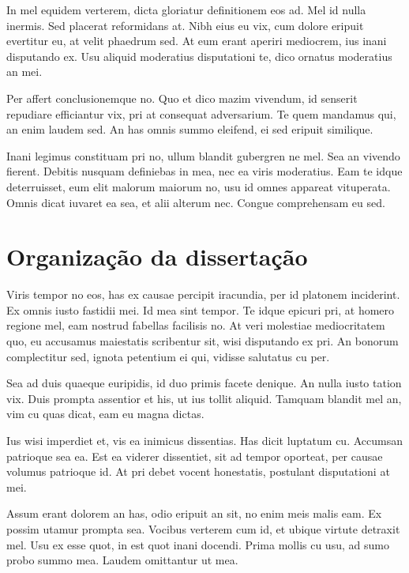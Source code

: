 In mel equidem verterem, dicta gloriatur definitionem eos ad. Mel id nulla inermis. Sed placerat reformidans at. Nibh eius eu vix, cum dolore eripuit evertitur eu, at velit phaedrum sed. At eum erant aperiri mediocrem, ius inani disputando ex. Usu aliquid moderatius disputationi te, dico ornatus moderatius an mei.

Per affert conclusionemque no. Quo et dico mazim vivendum, id senserit repudiare efficiantur vix, pri at consequat adversarium. Te quem mandamus qui, an enim laudem sed. An has omnis summo eleifend, ei sed eripuit similique.

Inani legimus constituam pri no, ullum blandit gubergren ne mel. Sea an vivendo fierent. Debitis nusquam definiebas in mea, nec ea viris moderatius. Eam te idque deterruisset, eum elit malorum maiorum no, usu id omnes appareat vituperata. Omnis dicat iuvaret ea sea, et alii alterum nec. Congue comprehensam eu sed.



\section{Organização da dissertação}

Viris tempor no eos, has ex causae percipit iracundia, per id platonem inciderint. Ex omnis iusto fastidii mei. Id mea sint tempor. Te idque epicuri pri, at homero regione mel, eam nostrud fabellas facilisis no. At veri molestiae mediocritatem quo, eu accusamus maiestatis scribentur sit, wisi disputando ex pri. An bonorum complectitur sed, ignota petentium ei qui, vidisse salutatus cu per.

Sea ad duis quaeque euripidis, id duo primis facete denique. An nulla iusto tation vix. Duis prompta assentior et his, ut ius tollit aliquid. Tamquam blandit mel an, vim cu quas dicat, eam eu magna dictas.

Ius wisi imperdiet et, vis ea inimicus dissentias. Has dicit luptatum cu. Accumsan patrioque sea ea. Est ea viderer dissentiet, sit ad tempor oporteat, per causae volumus patrioque id. At pri debet vocent honestatis, postulant disputationi at mei.

Assum erant dolorem an has, odio eripuit an sit, no enim meis malis eam. Ex possim utamur prompta sea. Vocibus verterem cum id, et ubique virtute detraxit mel. Usu ex esse quot, in est quot inani docendi. Prima mollis cu usu, ad sumo probo summo mea. Laudem omittantur ut mea.

